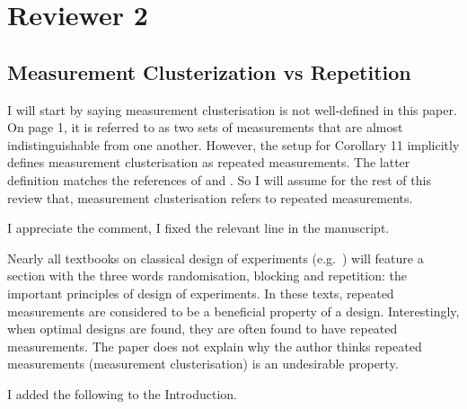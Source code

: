 \section{Reviewer 2}\label{ref2}
\subsection{Measurement Clusterization vs Repetition}
\RC I will start by saying measurement clusterisation is not
well-defined in this paper. On page 1, it is referred to as two sets
of measurements that are almost indistinguishable from one
another. However, the setup for Corollary 11 implicitly defines
measurement clusterisation as repeated measurements. The latter
definition matches the references of \cite{fedorov1996} and
\cite{nyberg2012}. So I will assume for the rest of this review that,
measurement clusterisation refers to repeated measurements.

\AR I appreciate the comment, I fixed the relevant line in the
manuscript.


\RC Nearly all textbooks on classical design of experiments
(e.g.~\cite[Section 1.2.4]{morris2011}) will feature a section with
the three words randomisation, blocking and repetition: the important
principles of design of experiments.  In these texts, repeated
measurements are considered to be a beneficial property of a
design. Interestingly, when optimal designs are found, they are often
found to have repeated measurements. The paper does not explain why
the author thinks repeated measurements (measurement clusterisation)
is an undesirable property.

\AR\label{rep} I added the following to the Introduction.

